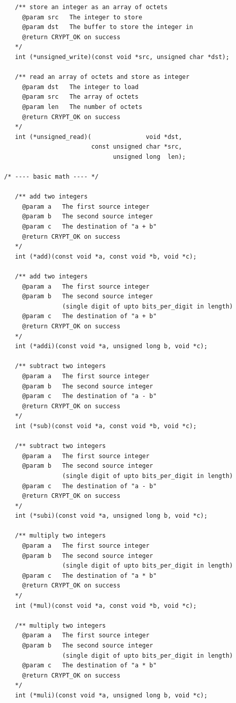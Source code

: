 \documentclass[synpaper]{book}
\begin{document}
\begin{small}
\begin{verbatim}
   /** store an integer as an array of octets
     @param src   The integer to store
     @param dst   The buffer to store the integer in
     @return CRYPT_OK on success
   */
   int (*unsigned_write)(const void *src, unsigned char *dst);

   /** read an array of octets and store as integer
     @param dst   The integer to load
     @param src   The array of octets
     @param len   The number of octets
     @return CRYPT_OK on success
   */
   int (*unsigned_read)(               void *dst,
                        const unsigned char *src,
                              unsigned long  len);

/* ---- basic math ---- */

   /** add two integers
     @param a   The first source integer
     @param b   The second source integer
     @param c   The destination of "a + b"
     @return CRYPT_OK on success
   */
   int (*add)(const void *a, const void *b, void *c);

   /** add two integers
     @param a   The first source integer
     @param b   The second source integer
                (single digit of upto bits_per_digit in length)
     @param c   The destination of "a + b"
     @return CRYPT_OK on success
   */
   int (*addi)(const void *a, unsigned long b, void *c);

   /** subtract two integers
     @param a   The first source integer
     @param b   The second source integer
     @param c   The destination of "a - b"
     @return CRYPT_OK on success
   */
   int (*sub)(const void *a, const void *b, void *c);

   /** subtract two integers
     @param a   The first source integer
     @param b   The second source integer
                (single digit of upto bits_per_digit in length)
     @param c   The destination of "a - b"
     @return CRYPT_OK on success
   */
   int (*subi)(const void *a, unsigned long b, void *c);

   /** multiply two integers
     @param a   The first source integer
     @param b   The second source integer
                (single digit of upto bits_per_digit in length)
     @param c   The destination of "a * b"
     @return CRYPT_OK on success
   */
   int (*mul)(const void *a, const void *b, void *c);

   /** multiply two integers
     @param a   The first source integer
     @param b   The second source integer
                (single digit of upto bits_per_digit in length)
     @param c   The destination of "a * b"
     @return CRYPT_OK on success
   */
   int (*muli)(const void *a, unsigned long b, void *c);


\end{verbatim}
\end{small}
\end{document}
